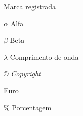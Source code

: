 
\begin{simbolos} \itemsep -1pt
\item[\textregistered] Marca registrada
\item[$\alpha$] Alfa
\item[$\beta$] Beta
\item[$\lambda$] Comprimento de onda
\item[\copyright] \textit{Copyright}
\item[\texteuro] Euro
\item[$\%$] Porcentagem
\end{simbolos}
